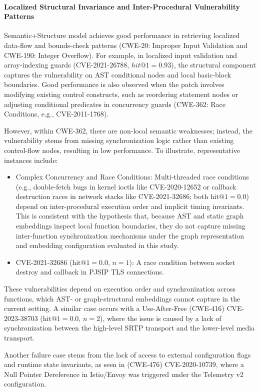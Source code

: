 \paragraph{Localized Structural Invariance and Inter-Procedural Vulnerability Patterns}
Semantic+Structure model achieves good performance in retrieving localized data-flow and bounds-check patterns (CWE-20: Improper Input Validation and CWE-190: Integer Overflow). 
For example, in localized input validation and array-indexing guards (CVE-2021-26788, $hit@1=0.93$), the structural component captures the vulnerability on AST conditional nodes and local basic-block boundaries. 
Good performance is also observed when the patch involves modifying existing control constructs, such as reordering statement nodes or adjusting conditional predicates in concurrency guards (CWE-362: Race Conditions, e.g., CVE-2011-1768).

However, within CWE-362, there are non-local semantic weaknesses; instead, the vulnerability stems from missing synchronization logic rather than existing control-flow nodes, resulting in low performance. 
To illustrate, representative instances include:
\begin{itemize}
    \item Complex Concurrency and Race Conditions: Multi-threaded race conditions (e.g., double-fetch bugs in kernel ioctls like CVE-2020-12652 or callback destruction races in network stacks like CVE-2021-32686; both $\text{hit@1}=0.0$) depend on inter-procedural execution order and implicit timing invariants. 
    This is consistent with the hypothesis that, because AST and static graph embeddings inspect local function boundaries, they do not capture missing inter-function synchronization mechanisms under the graph representation and embedding configuration evaluated in this study.
    \item CVE-2021-32686 ($\text{hit@1}=0.0$, $n=1$): A race condition between socket destroy and callback in PJSIP TLS connections.
\end{itemize}

These vulnerabilities depend on execution order and synchronization across functions, which AST- or graph-structural embeddings cannot capture in the current setting. 
A similar case occurs with a Use-After-Free (CWE-416) CVE-2023-38703 ($\text{hit@1}=0.0$, $n=2$), where the issue is caused by a lack of synchronization between the high-level SRTP transport and the lower-level media transport.

Another failure case stems from the lack of access to external configuration flags and runtime state invariants, as seen in (CWE-476) CVE-2020-10739, where a Null Pointer Dereference in Istio/Envoy was triggered under the Telemetry v2 configuration.

